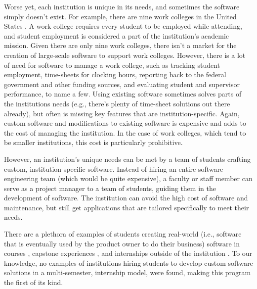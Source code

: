 Worse yet, each institution is unique in its needs, and sometimes the software simply doesn't exist. For example, there are nine work colleges in the United States \cite{WCCMembers, Ecclesia}. A work college requires every student to be employed while attending, and student employment is considered a part of the institution's academic mission. Given there are only nine work colleges, there isn't a market for the creation of large-scale software to support work colleges. However, there is a lot of need for software to manage a work college, such as tracking student employment, time-sheets for clocking hours, reporting back to the federal government and other funding sources, and evaluating student and supervisor performance, to name a few. Using existing software sometimes solves parts of the institutions needs (e.g., there's plenty of time-sheet solutions out there already), but often is missing key features that are institution-specific. Again, custom software and modifications to existing software is expensive and adds to the cost of managing the institution. In the case of work colleges, which tend to be smaller institutions, this cost is particularly prohibitive. 

However, an institution's unique needs can be met by a team of students crafting custom, institution-specific software. Instead of hiring an entire software engineering team (which would be quite expensive), a faculty or staff member can serve as a project manager to a team of students, guiding them in the development of software. The institution can avoid the high cost of software and maintenance, but still get applications that are tailored specifically to meet their needs.

There are a plethora of examples of students creating real-world (i.e., software that is eventually used by the product owner to do their business) software in courses \cite{coursevsproject, tadayon2004software}, capstone experiences \cite{keogh2007scalable, capstone}, and internships outside of the institution \cite{rochesterfirstundergradsoftwareteam}. To our knowledge, no examples of institutions hiring students to develop custom software solutions in a multi-semester, internship model, were found, making this program the first of its kind. 


